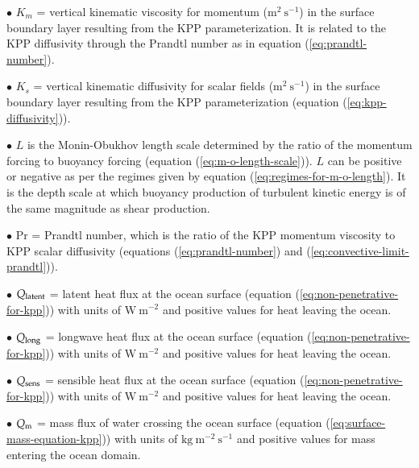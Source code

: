 \begin{mdframed}[backgroundcolor=lightgray!50]
\begin{trivlist}
\item[$\bullet$] $K_{m}$ = vertical kinematic viscosity for momentum
  ($\mbox{m}^{2}~\mbox{s}^{-1}$) in the surface boundary layer
  resulting from the KPP parameterization.  It is related to the KPP
  diffusivity through the Prandtl number as in equation
  (\ref{eq:prandtl-number}).

\item[$\bullet$] $K_{s}$ = vertical kinematic diffusivity for scalar
  fields ($\mbox{m}^{2}~\mbox{s}^{-1}$) in the surface boundary layer
  resulting from the KPP parameterization (equation
  (\ref{eq:kpp-diffusivity})).

\item[$\bullet$] $L$ is the Monin-Obukhov length scale determined by
  the ratio of the momentum forcing to buoyancy forcing (equation
  (\ref{eq:m-o-length-scale})).  $L$ can be positive or negative as
  per the regimes given by equation (\ref{eq:regimes-for-m-o-length}).
  It is the depth scale at which buoyancy production of turbulent
  kinetic energy is of the same magnitude as shear production.

\item[$\bullet$] $\mbox{Pr}$ = Prandtl number, which is the ratio of
  the KPP momentum viscosity to KPP scalar diffusivity (equations
  (\ref{eq:prandtl-number}) and (\ref{eq:convective-limit-prandtl})).

\item[$\bullet$] $Q_{\mbox{\scriptsize latent}}$ = latent heat flux at
  the ocean surface (equation (\ref{eq:non-penetrative-for-kpp})) with
  units of $\mbox{W}~\mbox{m}^{-2}$ and positive values for heat
  leaving the ocean.

\item[$\bullet$] $Q_{\mbox{\scriptsize long}}$ = longwave heat flux at
  the ocean surface (equation (\ref{eq:non-penetrative-for-kpp})) with
  units of $\mbox{W}~\mbox{m}^{-2}$ and positive values for heat
  leaving the ocean.

\item[$\bullet$] $Q_{\mbox{\scriptsize sens}}$ = sensible heat flux at
  the ocean surface (equation (\ref{eq:non-penetrative-for-kpp})) with
  units of $\mbox{W}~\mbox{m}^{-2}$ and positive values for heat
  leaving the ocean.

\item[$\bullet$] $Q_{\mbox{\scriptsize m}}$ = mass flux of water crossing the ocean surface
  (equation (\ref{eq:surface-mass-equation-kpp})) with units of
  $\mbox{kg}~\mbox{m}^{-2}~\mbox{s}^{-1}$ and positive values for mass
  entering the ocean domain. 


\end{trivlist}
\end{mdframed}
